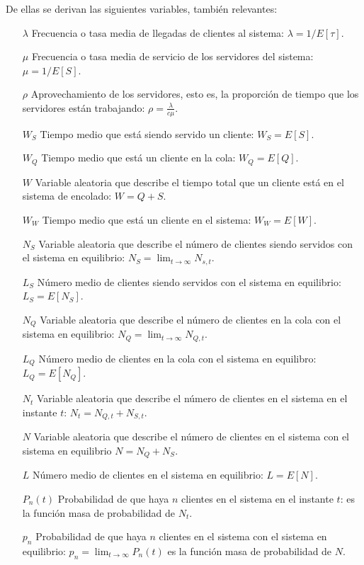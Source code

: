 \documentclass[a4paper,10pt]{scrartcl}
\theoremstyle{definition}
\numberwithin{equation}{section}
\begin{document}

De ellas se derivan las siguientes variables, también relevantes:
\begin{itemize}
\item [$\lambda$]
  Frecuencia o tasa media de llegadas de clientes al sistema: $\lambda = 1/E[\tau]$.
\item [$\mu$]
  Frecuencia o tasa media de servicio de los servidores del sistema: $\mu = 1/E[S]$.
\item [$\rho$]
  Aprovechamiento de los servidores, esto es, la proporción de tiempo que los servidores están trabajando: $\rho = \frac{\lambda}{c\mu}$.
\item [$W_S$]
  Tiempo medio que está siendo servido un cliente: $W_S  = E[S]$.
\item [$W_Q$]
  Tiempo medio que está un cliente en la cola: $W_Q = E[Q]$.
\item [$W$]
  Variable aleatoria que describe el tiempo total que un cliente está en el sistema de encolado: $W = Q+S$.
\item [$W_W$]
  Tiempo medio que está un cliente en el sistema: $W_W = E[W]$.
\item [$N_S$]
  Variable aleatoria que describe el número de clientes siendo servidos con el sistema en equilibrio: $N_S = \lim_{t \rightarrow \infty} N_{s,t}$.
\item [$L_S$]
  Número medio de clientes siendo servidos con el sistema en equilibrio: \\ $L_S = E[N_S]$.
\item [$N_Q$]
  Variable aleatoria que describe el número de clientes en la cola con el sistema en equilibrio: $N_Q = \lim_{t \rightarrow \infty} N_{Q,t}$.
\item [$L_Q$]
  Número medio de clientes en la cola con el sistema en equilibro: $L_Q = E[N_Q]$.
\item [$N_t$]
  Variable aleatoria que describe el número de clientes en el sistema en el instante $t$: $N_t = N_{Q,t} + N_{S,t}$.
\item [$N$]
  Variable aleatoria que describe el número de clientes en el sistema con el sistema en equilibrio $N = N_Q + N_S$.
\item [$L$]
  Número medio de clientes en el sistema en equilibrio: $L = E[N]$.
\item [$P_n(t)$]
  Probabilidad de que haya $n$ clientes en el sistema en el instante $t$: es la función masa de probabilidad de $N_t$.
\item [$p_n$]
  Probabilidad de que haya $n$ clientes en el sistema con el sistema en equilibrio: $p_n = \lim_{t \rightarrow \infty} P_n(t)$ es la función masa de probabilidad de $N$.
\end{itemize}
\end{document}
